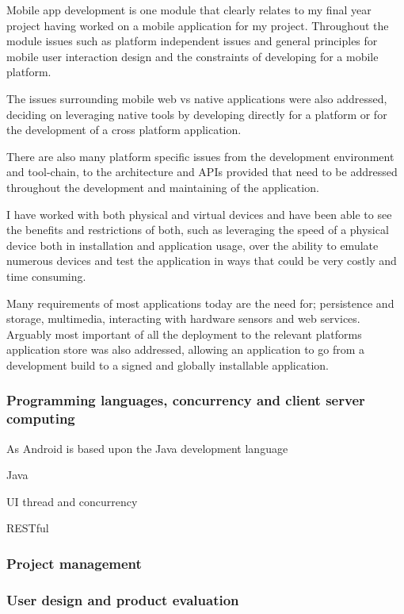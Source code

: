 Mobile app development is one module that clearly relates to my final
year project having worked on a mobile application for my project.
Throughout the module issues such as platform independent issues and
general principles for mobile user interaction design and the
constraints of developing for a mobile platform.

The issues surrounding mobile web vs native applications were also
addressed, deciding on leveraging native tools by developing directly
for a platform or for the development of a cross platform application.

There are also many platform specific issues from the development
environment and tool-chain, to the architecture and APIs provided that
need to be addressed throughout the development and maintaining of the
application.

I have worked with both physical and virtual devices and have been able
to see the benefits and restrictions of both, such as leveraging the
speed of a physical device both in installation and application usage,
over the ability to emulate numerous devices and test the application in
ways that could be very costly and time consuming.

Many requirements of most applications today are the need for;
persistence and storage, multimedia, interacting with hardware sensors
and web services. Arguably most important of all the deployment to the
relevant platforms application store was also addressed, allowing an
application to go from a development build to a signed and globally
installable application.

\subsubsection{Programming languages, concurrency and client server
computing}\label{programming-languages-concurrency-and-client-server-computing}

As Android is based upon the Java development language

Java

UI thread and concurrency

RESTful

\subsubsection{Project management}\label{project-management}

\subsubsection{User design and product
evaluation}\label{user-design-and-product-evaluation}
